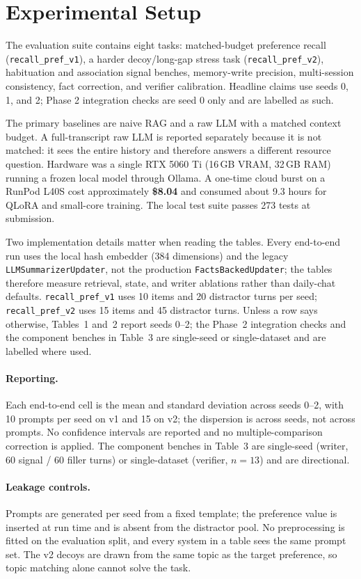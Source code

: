 \documentclass[11pt]{article}
\begin{document}
\section{Experimental Setup}
The evaluation suite contains eight tasks: matched-budget preference recall (\texttt{recall\_pref\_v1}), a harder decoy/long-gap stress task (\texttt{recall\_pref\_v2}), habituation and association signal benches, memory-write precision, multi-session consistency, fact correction, and verifier calibration. Headline claims use seeds 0, 1, and 2; Phase 2 integration checks are seed 0 only and are labelled as such.

The primary baselines are naive RAG and a raw LLM with a matched context budget. A full-transcript raw LLM is reported separately because it is not matched: it sees the entire history and therefore answers a different resource question. Hardware was a single RTX 5060 Ti (16\,GB VRAM, 32\,GB RAM) running a frozen local model through Ollama. A one-time cloud burst on a RunPod L40S cost approximately \textbf{\$8.04} and consumed about 9.3 hours for QLoRA and small-core training. The local test suite passes 273 tests at submission.

Two implementation details matter when reading the tables. Every end-to-end run uses the local hash embedder (384 dimensions) and the legacy \texttt{LLMSummarizerUpdater}, not the production \texttt{FactsBackedUpdater}; the tables therefore measure retrieval, state, and writer ablations rather than daily-chat defaults. \texttt{recall\_pref\_v1} uses 10 items and 20 distractor turns per seed; \texttt{recall\_pref\_v2} uses 15 items and 45 distractor turns. Unless a row says otherwise, Tables~1 and~2 report seeds 0--2; the Phase~2 integration checks and the component benches in Table~3 are single-seed or single-dataset and are labelled where used.

\paragraph{Reporting.}
Each end-to-end cell is the mean and standard deviation across seeds 0--2, with 10 prompts per seed on v1 and 15 on v2; the dispersion is across seeds, not across prompts. No confidence intervals are reported and no multiple-comparison correction is applied. The component benches in Table~3 are single-seed (writer, 60 signal / 60 filler turns) or single-dataset (verifier, $n=13$) and are directional.

\paragraph{Leakage controls.}
Prompts are generated per seed from a fixed template; the preference value is inserted at run time and is absent from the distractor pool. No preprocessing is fitted on the evaluation split, and every system in a table sees the same prompt set. The v2 decoys are drawn from the same topic as the target preference, so topic matching alone cannot solve the task.
\end{document}
